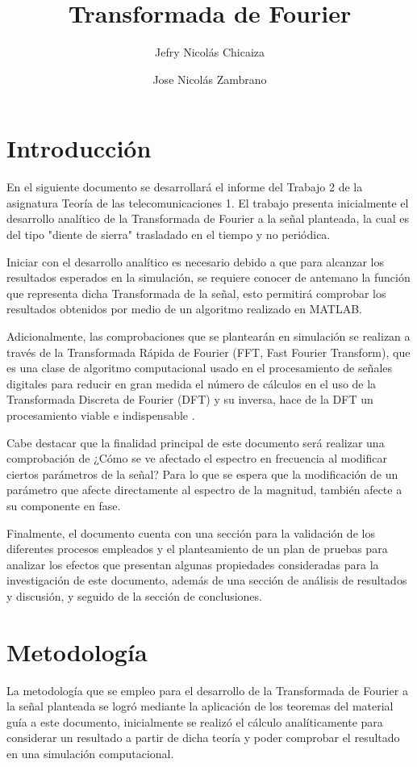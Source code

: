 \documentclass[11pt,letterpaper,twocolumn]{article}
\title{
    \fontsize{26}{26}\selectfont 
    \textbf{Transformada de Fourier
    \vspace{-5mm}}}
\author[1]{Jefry Nicolás Chicaiza}
\author[2]{Jose Nicolás Zambrano}
\affil[1]{\url{jefryn@unicauca.edu.co}
    \vspace{-2mm}}
\affil[2]{\url{jnzambranob@unicauca.edu.co}
    \vspace{-5mm}}
\date{}
\begin{document}
\maketitle
\vspace{-5mm}
\thispagestyle{fancy}
\section{Introducción}\label{intro}
    En el siguiente documento se desarrollará el informe del Trabajo 2 de la asignatura 
    Teoría de las telecomunicaciones 1. El trabajo presenta inicialmente el desarrollo 
    analítico de la Transformada de Fourier a la señal planteada, la cual es del tipo 
    "diente de sierra"  trasladado en el tiempo y no periódica.
    
    Iniciar con el desarrollo analítico es necesario debido a que para alcanzar los 
    resultados esperados en la simulación, se requiere conocer de antemano la función que 
    representa dicha Transformada de la señal, esto permitirá comprobar los resultados 
    obtenidos por medio de un algoritmo realizado en MATLAB.
    
    Adicionalmente, las comprobaciones que se plantearán en simulación se realizan a través 
    de la Transformada Rápida de Fourier (FFT, Fast Fourier Transform), que es una clase de 
    algoritmo computacional usado en el procesamiento de señales digitales para reducir en gran 
    medida el número de cálculos en el uso de la Transformada Discreta de Fourier (DFT) y su 
    inversa, hace de la DFT un procesamiento viable e indispensable \cite{Poularikas2007}.
    
    Cabe destacar que la finalidad principal de este documento será realizar una comprobación de
    ¿Cómo se ve afectado el espectro en frecuencia al modificar ciertos parámetros de la señal?
    Para lo que se espera que la modificación de un parámetro que afecte directamente al espectro 
    de la magnitud, también afecte a su componente en fase.
    
    Finalmente, el documento cuenta con una sección para la validación de los diferentes procesos
    empleados y el planteamiento de un plan de pruebas para analizar los efectos que presentan
    algunas propiedades consideradas para la investigación de este documento, además de una sección
    de análisis de resultados y discusión, y seguido de la sección de conclusiones.
       
\section{Metodología}
    La metodología que se empleo para el desarrollo de la Transformada de Fourier a la señal planteada 
    se logró mediante la aplicación de los teoremas del material guía a este documento, inicialmente
    se realizó el cálculo analíticamente para considerar un resultado a partir de dicha teoría y
    poder comprobar el resultado en una simulación computacional. 
    
\end{document}
